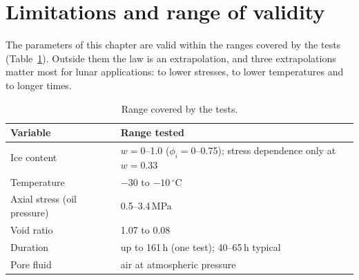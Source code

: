\section{Limitations and range of validity}
\label{sec:model_limits}

The parameters of this chapter are valid within the ranges covered by the tests (Table~\ref{tab:validity}). Outside them the law is an extrapolation, and three extrapolations matter most for lunar applications: to lower stresses, to lower temperatures and to longer times.

\begin{table}[H]
\centering
\small
\begin{tabular}{@{}ll@{}}
\toprule
Variable & Range tested \\
\midrule
Ice content & $w = 0$--1.0 ($\phi_i = 0$--0.75); stress dependence only at $w = 0.33$ \\
Temperature & $-30$ to $-10\,^\circ$C \\
Axial stress (oil pressure) & 0.5--3.4\,MPa \\
Void ratio & 1.07 to 0.08 \\
Duration & up to 161\,h (one test); 40--65\,h typical \\
Pore fluid & air at atmospheric pressure \\
\bottomrule
\end{tabular}
\caption{Range covered by the tests.}
\label{tab:validity}
\end{table}

